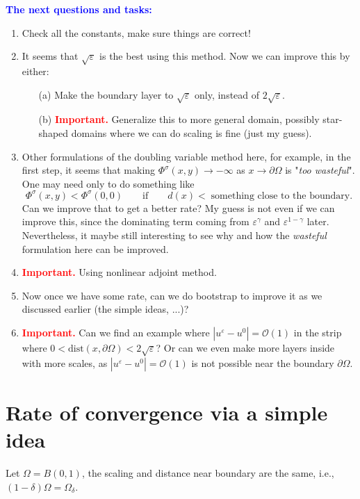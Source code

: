 \documentclass[11pt,reqno]{amsart}
\numberwithin{figure}{section}
\theoremstyle{plain}
\theoremstyle{remark}
\numberwithin{equation}{section}
\begin{document}
\color{blue}
\textcolor{blue}{\textbf{The next questions and tasks:}}
\begin{enumerate}
    \item Check all the constants, make sure things are correct!
    \item It seems that $\sqrt{\varepsilon}$ is the best using this method. Now we can improve this by either:
    \begin{itemize}
        \item[(a)] Make the boundary layer to $\sqrt{\varepsilon}$ only, instead of $2\sqrt{\varepsilon}$.
        \item[(b)] \textcolor{red}{\textbf{Important.}} Generalize this to more general domain, possibly star-shaped domains where we can do scaling is fine (just my guess).
    \end{itemize}
    \item Other formulations of the doubling variable method here, for example, in the first step, it seems that making $\Phi^\sigma(x,y)\to  -\infty$ as $x\to \partial\Omega$ is "\emph{too wasteful}". One may need only to do something like
    \begin{equation*}
        \Phi^\sigma(x,y) < \Phi^\sigma(0,0) \qquad\text{if}\qquad d(x) < \;\text{something close to the boundary}.
    \end{equation*}
    Can we improve that to get a better rate? My guess is not even if we can improve this, since the dominating term coming from $\varepsilon^\gamma$ and $\varepsilon^{1-\gamma}$ later. Nevertheless, it maybe still interesting to see why and how the \emph{wasteful} formulation here can be improved.
    \item \textcolor{red}{\textbf{Important.}} Using nonlinear adjoint method.
    \item Now once we have some rate, can we do bootstrap to improve it as we discussed earlier (the simple ideas, ...)?
    \item \textcolor{red}{\textbf{Important.}} Can we find an example where $|u^\varepsilon - u^0| = \mathcal{O}(1)$ in the strip where $0<\mathrm{dist}(x,\partial\Omega)<2\sqrt{\varepsilon}$? Or can we even make more layers inside with more scales, as $|u^\varepsilon - u^0| = \mathcal{O}(1)$ is not possible near the boundary $\partial\Omega$.
\end{enumerate}
\color{black}


\newpage
\section{Rate of convergence via a simple idea}
\noindent Let $\Omega = B(0,1)$, the scaling and distance near boundary are the same, i.e., $(1-\delta)\Omega = \Omega_\delta$.
\end{document}
